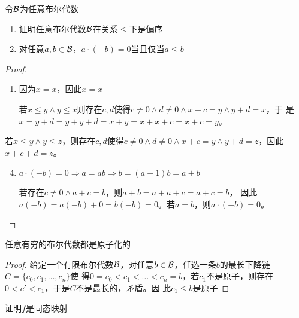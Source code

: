 \documentclass[11pt]{article}
\begin{document}
\begin{exercise}[3.1.10]
令\(\mathcal{B}\)为任意布尔代数
\begin{enumerate}
\item 证明任意布尔代数\(\mathcal{B}\)在关系\(\le\)下是偏序
\setcounter{enumi}{3}
\item 对任意\(a,b\in\mathcal{B}\)，\(a\cdot(-b)=0\)当且仅当\(a\le b\)
\end{enumerate}
\end{exercise}

\begin{proof}
\begin{enumerate}
\item 因为\(x=x\)，因此\(x=x\)

若\(x\le y\wedge y\le x\)则存在\(c,d\)使得\(c\neq 0\wedge d\neq 0\wedge x+c=y\wedge y+d=x\)，于
是\(x=y+d=y+y+d=x+y=x+x+c=x+c=y\)。
\end{enumerate}


若\(x\le y\wedge y\le z\)，则存在\(c,d\)使得\(c\neq 0\wedge d\neq 0\wedge x+c=y\wedge y+d=z\)，因此\(x+c+d=z\)。

\begin{enumerate}
\setcounter{enumi}{3}
\item \(a\cdot(-b)=0\Rightarrow a=ab\Rightarrow b=(a+1)b=a+b\)

若存在\(c\neq 0\wedge a+c=b\)，则\(a+b=a+a+c=a+c=b\)，
因此\(a(-b)=a(-b)+0=b(-b)=0\)。若\(a=b\)，则\(a\cdot(-b)=0\)。
\end{enumerate}
\end{proof}

\begin{exercise}[3.1.13]
任意有穷的布尔代数都是原子化的
\end{exercise}

\begin{proof}
给定一个有限布尔代数\(\mathcal{B}\)，对任意\(b\in\mathcal{B}\)，任选一条\(b\)的最长下降链\(C=\{c_0,c_1,\dots,c_n\}\)使
得\(0=c_0<c_1<\dots<c_n=b\)，若\(c_1\)不是原子，则存在\(0<c'<c_1\)，于是\(C\)不是最长的，矛盾。因
此\(c_1\le b\)是原子
\end{proof}

\begin{exercise}[3.1.16]
证明\(f\)是同态映射
\end{exercise}
\end{document}

